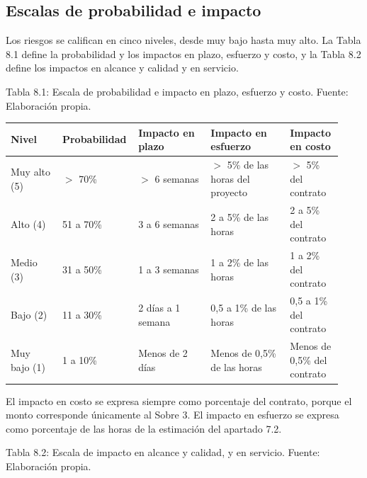 \documentclass[11pt]{article}
\begin{document}
\subsection{Escalas de probabilidad e impacto}

Los riesgos se califican en cinco niveles, desde muy bajo hasta muy alto. La Tabla 8.1 define la probabilidad y los impactos en plazo, esfuerzo y costo, y la Tabla 8.2 define los impactos en alcance y calidad y en servicio.

Tabla 8.1: Escala de probabilidad e impacto en plazo, esfuerzo y costo. Fuente: Elaboración propia.

\begin{longtable}{p{0.158\linewidth}p{0.158\linewidth}p{0.218\linewidth}p{0.237\linewidth}p{0.158\linewidth}}
\toprule
\textbf{Nivel} & \textbf{Probabilidad} & \textbf{Impacto en plazo} & \textbf{Impacto en esfuerzo} & \textbf{Impacto en costo} \\
\midrule
\endhead
\bottomrule
\endlastfoot
Muy alto (5) & $>$ 70\% & $>$ 6 semanas & $>$ 5\% de las horas del proyecto & $>$ 5\% del contrato \\
Alto (4) & 51 a 70\% & 3 a 6 semanas & 2 a 5\% de las horas & 2 a 5\% del contrato \\
Medio (3) & 31 a 50\% & 1 a 3 semanas & 1 a 2\% de las horas & 1 a 2\% del contrato \\
Bajo (2) & 11 a 30\% & 2 días a 1 semana & 0,5 a 1\% de las horas & 0,5 a 1\% del contrato \\
Muy bajo (1) & 1 a 10\% & Menos de 2 días & Menos de 0,5\% de las horas & Menos de 0,5\% del contrato \\
\end{longtable}

El impacto en costo se expresa siempre como porcentaje del contrato, porque el monto corresponde únicamente al Sobre 3. El impacto en esfuerzo se expresa como porcentaje de las horas de la estimación del apartado 7.2.

Tabla 8.2: Escala de impacto en alcance y calidad, y en servicio. Fuente: Elaboración propia.
\end{document}

